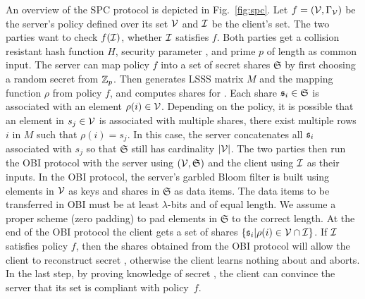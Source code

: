 An overview of the \ac{SPC} protocol is depicted in Fig.~\ref{fig:spc}. 
Let $f=(\mathcal{V},\Gamma_\mathcal{V})$ be the server's policy defined over its set $\mathcal{V}$ and $\mathcal{I}$ be the client's set. 
The two parties want to check $f(\mathcal{I})$, \ie whether $\mathcal{I}$ satisfies $f$. 
Both parties get a collision resistant hash function $H$, security parameter \secpar, and prime $p$ of length \secpar as common input. 
The server can map policy $f$ into a set of secret shares $\mathfrak{S}$ by first choosing a random secret \secret from $\mathbb{Z}_p$.
Then \Server generates \ac{LSSS} matrix $M$ and the mapping function $\rho$ from policy $f$, and computes shares for \secret. 
Each share $\mathfrak{s}_i \in \mathfrak{S}$ is associated with an element $\rho(i)\in \mathcal{V}$. 
Depending on the policy, it is possible that an element in $s_j\in\mathcal{V}$ is associated with multiple shares, \ie there exist multiple rows $i$ in $M$ such that $\rho(i)=s_j$. 
In this case, the server concatenates all $\mathfrak{s}_i$ associated with $s_j$ so that $\mathfrak{S}$ still has cardinality $|\mathcal{V}|$. 
The two parties then run the \ac{OBI} protocol with the server using $(\mathcal{V}, \mathfrak{S})$ and the client using $\mathcal{I}$ as their inputs. 
In the \ac{OBI} protocol, the server's garbled Bloom filter is built using elements in $\mathcal{V}$ as keys and shares in $\mathfrak{S}$ as data items.
The data items to be transferred in \ac{OBI} must be at least $\lambda$-bits and of equal length. 
We assume a proper scheme (\eg zero padding) to pad elements in $\mathfrak{S}$ to the correct length.
At the end of the \ac{OBI} protocol the client gets a set of shares $\{\mathfrak{s}_i|\rho(i)\in \mathcal{V}\cap \mathcal{I}\}$. 
If $\mathcal{I}$ satisfies policy $f$, then the shares obtained from the \ac{OBI} protocol will allow the client to reconstruct secret \secret, otherwise the client learns nothing about \secret and aborts. 
In the last step, by proving knowledge of secret \secret, the client can convince the server that its set is compliant with policy~$f$.

